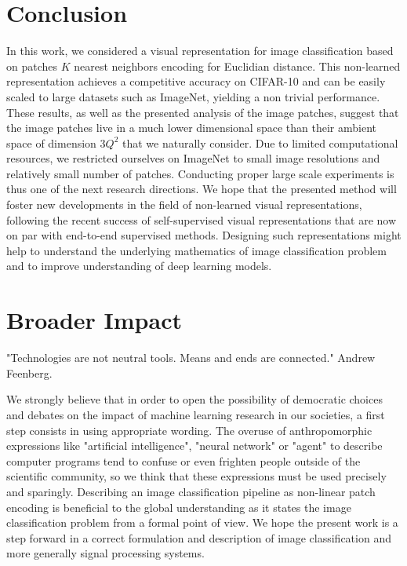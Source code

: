 \documentclass{article}
\begin{document}
\section{Conclusion}

In this work, we considered a visual representation for image classification based on patches $K$ nearest neighbors encoding for Euclidian distance.
This non-learned representation achieves a competitive accuracy on CIFAR-10 and can be easily scaled to large datasets such as ImageNet, yielding a non trivial performance.
These results, as well as the presented analysis of the image patches, suggest that the image patches live in a much lower dimensional space than their ambient space of dimension $3Q^2$ that we naturally consider.
Due to limited computational resources, we restricted ourselves on ImageNet to small image resolutions and  relatively small number of patches. 
Conducting proper large scale experiments is thus one of the next research directions.
We hope that the presented method will foster new developments in the field of non-learned visual representations, following the recent success  of  self-supervised visual representations that are now on par with end-to-end supervised methods.
Designing such representations might help to understand the underlying mathematics of image classification problem and to improve understanding of deep learning models.

\newpage

\section*{Broader Impact}

"Technologies are not neutral tools. Means and ends are connected." Andrew Feenberg.

We strongly believe that in order to open the possibility of democratic choices and debates on the impact of machine learning research in our societies, a first step consists in using appropriate wording.
The overuse of anthropomorphic expressions like "artificial intelligence", "neural network" or "agent" to describe computer programs tend to confuse or even frighten people outside of the scientific community, so we think that these expressions must be used precisely and sparingly.
Describing an image classification pipeline as non-linear patch encoding is  beneficial to the global understanding as it states the image classification problem from a formal point of view.
We hope the present work is a step forward in a correct formulation and description of image classification and more generally signal processing systems.
\end{document}
